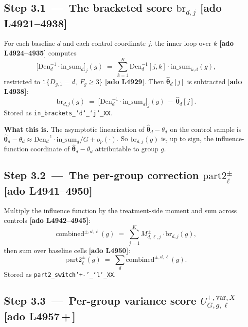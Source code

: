 \documentclass[11pt]{article}
\newcommand{\code}[1]{\texttt{\small #1}}
\newcommand{\Adoref}[1]{\textcolor{accent}{\footnotesize\textbf{[ado L#1]}}}
\newcommand{\1}{\mathbb{1}}
\newcommand{\thetad}{\widehat{\bm{\theta}}_d}
\begin{document}
\subsection*{Step 3.1 \,---\, The bracketed score $\mathrm{br}_{d,j}$ \Adoref{4921--4938}}

For each baseline $d$ and each control coordinate $j$, the inner loop over $k$
\Adoref{4924--4935} computes
\begin{equation}
\bigl[\mathrm{Den}_d^{-1}\cdot \mathrm{in\_sum}_d\bigr]_{j}(g) \;=\; \sum_{k=1}^{K}\mathrm{Den}_d^{-1}[j,k]\cdot \mathrm{in\_sum}_{k,d}(g),
\label{eq:braprod}
\end{equation}
restricted to $\1\{D_{g,1}=d,\ F_g\ge 3\}$ \Adoref{4929}.
Then $\thetad[j]$ is subtracted \Adoref{4938}:
\begin{equation}
\boxed{\;\mathrm{br}_{d,j}(g) \;=\; \bigl[\mathrm{Den}_d^{-1}\cdot \mathrm{in\_sum}_d\bigr]_j(g) \,-\, \thetad[j].\;}
\label{eq:bra}
\end{equation}
Stored as \code{in\_brackets\_`d'\_`j'\_XX}.

\medskip\noindent
\textbf{What this is.} The asymptotic linearization of
$\thetad - \theta_d$ on the control sample is
$\thetad - \theta_d \approx \mathrm{Den}_d^{-1}\cdot \mathrm{in\_sum}_d / G + o_p(\cdot)$.
So $\mathrm{br}_{d,j}(g)$ is, up to sign, the influence-function coordinate of
$\thetad - \theta_d$ attributable to group $g$.

\subsection*{Step 3.2 \,---\, The per-group correction $\mathrm{part2}^{\pm}_{\ell}$ \Adoref{4941--4950}}

Multiply the influence function by the treatment-side moment and sum across
controls \Adoref{4942--4945}:
\begin{equation}
\mathrm{combined}^{\pm,d,\ell}(g) \;=\; \sum_{j=1}^{K} M^{\pm}_{d,\ell,j}\cdot \mathrm{br}_{d,j}(g),
\label{eq:combined}
\end{equation}
then sum over baseline cells \Adoref{4950}:
\begin{equation}
\boxed{\;\mathrm{part2}^{\pm}_{\ell}(g) \;=\; \sum_{d}\mathrm{combined}^{\pm,d,\ell}(g).\;}
\label{eq:part2}
\end{equation}
Stored as \code{part2\_switch`+\!-'\_`l'\_XX}.

\subsection*{Step 3.3 \,---\, Per-group variance score $U^{\pm,\mathrm{var},X}_{G,g,\ell}$ \Adoref{4957\,+\,}}
\end{document}
